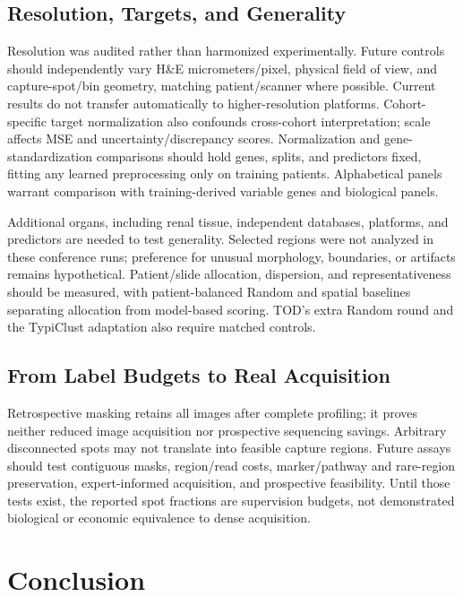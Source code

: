 \subsection{Resolution, Targets, and Generality}

Resolution was audited rather than harmonized experimentally. Future controls should independently vary H\&E micrometers/pixel, physical field of view, and capture-spot/bin geometry, matching patient/scanner where possible. Current results do not transfer automatically to higher-resolution platforms. Cohort-specific target normalization also confounds cross-cohort interpretation; scale affects MSE and uncertainty/discrepancy scores. Normalization and gene-standardization comparisons should hold genes, splits, and predictors fixed, fitting any learned preprocessing only on training patients. Alphabetical panels warrant comparison with training-derived variable genes and biological panels.

Additional organs, including renal tissue, independent databases, platforms, and predictors are needed to test generality. Selected regions were not analyzed in these conference runs; preference for unusual morphology, boundaries, or artifacts remains hypothetical. Patient/slide allocation, dispersion, and representativeness should be measured, with patient-balanced Random and spatial baselines separating allocation from model-based scoring. TOD's extra Random round and the TypiClust adaptation also require matched controls.

\subsection{From Label Budgets to Real Acquisition}

Retrospective masking retains all images after complete profiling; it proves neither reduced image acquisition nor prospective sequencing savings. Arbitrary disconnected spots may not translate into feasible capture regions. Future assays should test contiguous masks, region/read costs, marker/pathway and rare-region preservation, expert-informed acquisition, and prospective feasibility. Until those tests exist, the reported spot fractions are supervision budgets, not demonstrated biological or economic equivalence to dense acquisition.

\section{Conclusion}

